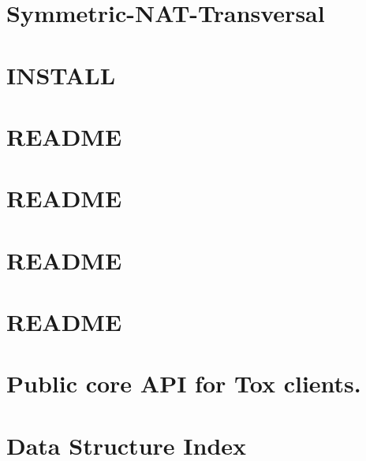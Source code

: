 \documentclass[twoside]{book}
\newcommand{\+}{\discretionary{\mbox{\scriptsize$\hookleftarrow$}}{}{}}
\begin{document}
\chapter{Symmetric-\/\+N\+A\+T-\/\+Transversal}
\label{md_docs_updates__symmetric-_n_a_t-_transversal}
\hypertarget{md_docs_updates__symmetric-_n_a_t-_transversal}{}

\chapter{I\+N\+S\+T\+A\+L\+L}
\label{md__i_n_s_t_a_l_l}
\hypertarget{md__i_n_s_t_a_l_l}{}

\chapter{R\+E\+A\+D\+M\+E}
\label{md_other_apidsl__r_e_a_d_m_e}
\hypertarget{md_other_apidsl__r_e_a_d_m_e}{}

\chapter{R\+E\+A\+D\+M\+E}
\label{md_other_astyle__r_e_a_d_m_e}
\hypertarget{md_other_astyle__r_e_a_d_m_e}{}

\chapter{R\+E\+A\+D\+M\+E}
\label{md_other_bootstrap_daemon__r_e_a_d_m_e}
\hypertarget{md_other_bootstrap_daemon__r_e_a_d_m_e}{}

\chapter{R\+E\+A\+D\+M\+E}
\label{md__r_e_a_d_m_e}
\hypertarget{md__r_e_a_d_m_e}{}

\chapter{Public core A\+P\+I for Tox clients.}
\label{core}
\hypertarget{core}{}

\chapter{Data Structure Index}

\end{document}
